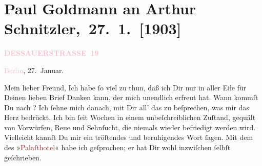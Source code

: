 

\renewcommand{\erwaehntePersonen}{Personen: Olga Schnitzler, ?? [Besitzer des Palasthotels Berlin, Anfang 1903]}
\renewcommand{\erwaehnteInstitutionen}{Institutionen: Palasthotel Berlin}
\renewcommand{\erwaehnteOrte}{Orte: Berlin, Dessauer Straße, Palasthotel Berlin, Wien}
\renewcommand{\erwaehnteWerke}{}
\section[ Paul Goldmann an Arthur Schnitzler, 27. 1. {[}1903{]}]{Paul Goldmann an Arthur Schnitzler, 27. 1. {[}1903{]}}
\nopagebreak{}
\rehead{ }\normalsize\beginnumbering{}
\toendnotes[C]{\smallbreak\pagebreak[2]}
\toendnotes[C]{\smallbreak}
\pstart
           \noindent{}\raggedleft{}{\pb}\textcolor{gray}{\textbf{\textcolor{pink}{DESSAUERSTRASSE 19}{}\ledrightnote{\textcolor{pink}{Dessauer Straße}}}}\pend
           
\pstart
           \textcolor{pink}{Berlin}{}\ledrightnote{\textcolor{pink}{Berlin}}, 27. Januar.\pend
           
\pstart\center{}Mein lieber Freund,\pend
\pstart
           Ich habe ſo viel zu thun, daß ich Dir nur in aller Eile für Deinen lieben Brief
               Danken kann, der mich unendlich erfreut hat. Wann kommſt Du nach \label{K_L03361-1v}\label{K_L03361-1h}? Ich ſehne mich danach, mit
               Dir all’ das zu beſprechen, was mir das Herz bedrückt. Ich bin ſeit Wochen in einem
               unbeſchreiblichen Zuſtand, gequält von Vorwürfen, Reue und Sehnſucht, die niemals {\pb}wieder befriedigt werden wird. Vielleicht kannſt Du
               mir ein tröſtendes und beruhigendes Wort ſagen. Mit dem \label{K_L03361-3v}\label{K_L03361-3h} des »\textcolor{brown}{Palaſthotel}{}\ledrightnote{\textcolor{brown}{Palasthotel Berlin}}« habe ich geſprochen; er hat Dir wohl
               inzwiſchen ſelbſt geſchrieben.\pend
           
